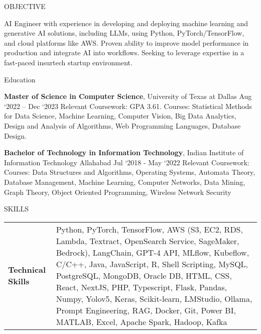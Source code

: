 \documentclass{resume}
\begin{document}
\begin{rSection}{OBJECTIVE}

{AI Engineer with experience in developing and deploying machine learning and generative AI solutions, including LLMs, using Python, PyTorch/TensorFlow, and cloud platforms like AWS. Proven ability to improve model performance in production and integrate AI into workflows. Seeking to leverage expertise in a fast-paced insurtech startup environment.}

\end{rSection}
\begin{rSection}{Education}

{\bf Master of Science in Computer Science}, University of Texas at Dallas \hfill {Aug ‘2022 – Dec ‘2023}
Relevant Coursework: GPA 3.61. Courses: Statistical Methods for Data Science, Machine Learning, Computer Vision, Big Data Analytics, Design and Analysis of Algorithms, Web Programming Languages, Database Design.

{\bf Bachelor of Technology in Information Technology}, Indian Institute of Information Technology Allahabad \hfill {Jul ‘2018 - May ‘2022}
Relevant Coursework: Courses: Data Structures and Algorithms, Operating Systems, Automata Theory, Database Management, Machine Learning, Computer Networks, Data Mining, Graph Theory, Object Oriented Programming, Wireless Network Security

\end{rSection}
\begin{rSection}{SKILLS}

\begin{tabular}{ @{} >{\bfseries}l @{\hspace{6ex}} l }
Technical Skills & Python, PyTorch, TensorFlow, AWS (S3, EC2, RDS, Lambda, Textract, OpenSearch Service, SageMaker, Bedrock), LangChain, GPT-4 API, MLflow, Kubeflow, C/C++, Java, JavaScript, R, Shell Scripting, MySQL, PostgreSQL, MongoDB, Oracle DB, HTML, CSS, React, NextJS, PHP, Typescript, Flask, Pandas, Numpy, Yolov5, Keras, Scikit-learn, LMStudio, Ollama, Prompt Engineering, RAG, Docker, Git, Power BI, MATLAB, Excel, Apache Spark, Hadoop, Kafka \\
\end{tabular}\\
\end{rSection}
\end{document}
